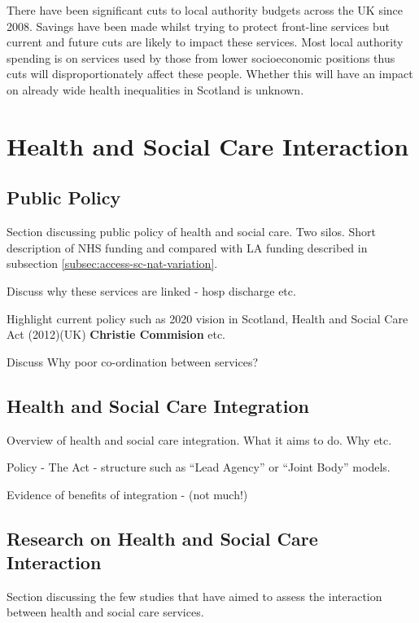 \documentclass[12pt,]{report}
\begin{document}
There have been significant cuts to local authority budgets across the
UK since 2008. Savings have been made whilst trying to protect
front-line services but current and future cuts are likely to impact
these services. Most local authority spending is on services used by
those from lower socioeconomic positions thus cuts will
disproportionately affect these people. Whether this will have an impact
on already wide health inequalities in Scotland is unknown.

\section{Health and Social Care Interaction}\label{sec:hsc-interaction}

\subsection{Public Policy}\label{subsec:policy}

Section discussing public policy of health and social care. Two silos.
Short description of NHS funding and compared with LA funding described
in subsection \ref{subsec:access-sc-nat-variation}.

Discuss why these services are linked - hosp discharge etc.

Highlight current policy such as 2020 vision in Scotland, Health and
Social Care Act (2012)(UK) \textbf{Christie Commision} etc.

Discuss Why poor co-ordination between services?

\subsection{Health and Social Care Integration}\label{subsec:hsc-integration}

Overview of health and social care integration. What it aims to do. Why
etc.

Policy - The Act - structure such as ``Lead Agency'' or ``Joint Body''
models.

Evidence of benefits of integration - (not much!)

\subsection{Research on Health and Social Care Interaction}\label{subsec:research}

Section discussing the few studies that have aimed to assess the
interaction between health and social care services.
\end{document}
